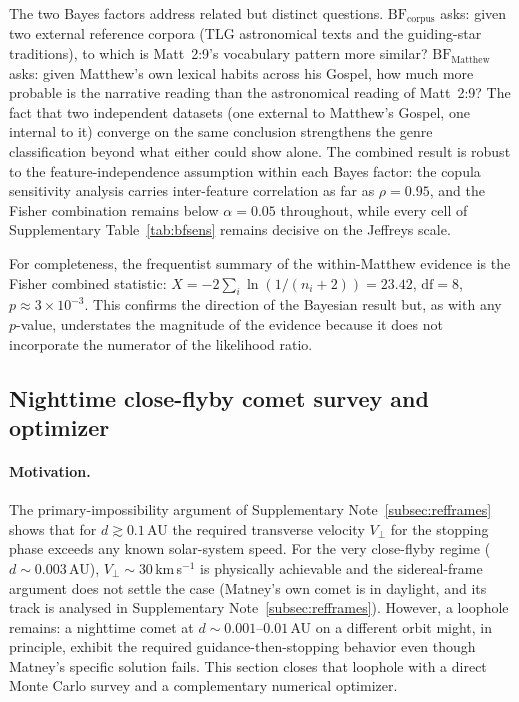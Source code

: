 \documentclass[11pt,a4paper]{article}
\begin{document}
The two Bayes factors address related but distinct questions.
$\mathrm{BF}_\text{corpus}$ asks: given two external reference corpora (TLG
astronomical texts and the guiding-star traditions), to which is Matt~2:9's
vocabulary pattern more similar? $\mathrm{BF}_\text{Matthew}$ asks: given
Matthew's own lexical habits across his Gospel, how much more probable is the
narrative reading than the astronomical reading of Matt~2:9? The fact that two
independent datasets (one external to Matthew's Gospel, one internal to
it) converge on the same conclusion strengthens the genre classification beyond
what either could show alone. The combined result is robust to the
feature-independence assumption within each Bayes factor: the copula
sensitivity analysis carries inter-feature correlation as far as
$\rho = 0.95$, and the Fisher combination remains below $\alpha = 0.05$
throughout, while every cell of Supplementary Table~\ref{tab:bfsens} remains decisive on the
Jeffreys scale.

For completeness, the frequentist summary of the within-Matthew evidence is the
Fisher combined statistic: $X = -2\sum_i \ln(1/(n_i+2)) = 23.42$,
$\mathrm{df} = 8$, $p \approx 3\times10^{-3}$. This confirms the direction of
the Bayesian result but, as with any $p$-value, understates the magnitude of the
evidence because it does not incorporate the numerator of the likelihood ratio.

\subsection{Nighttime close-flyby comet survey and optimizer}
\label{subsec:closeflyby}

\paragraph{Motivation.}
The primary-impossibility argument of Supplementary Note~\ref{subsec:refframes} shows that for $d \gtrsim 0.1$\,AU
the required transverse velocity $V_\perp$ for the stopping phase exceeds any
known solar-system speed. For the very close-flyby regime ($d \sim 0.003$\,AU),
$V_\perp \sim 30$\,km\,s$^{-1}$ is physically achievable and the sidereal-frame
argument does not settle the case (Matney's own comet is in daylight, and its
track is analysed in Supplementary Note~\ref{subsec:refframes}). However, a loophole
remains: a nighttime comet at $d \sim 0.001$--$0.01$\,AU on a different orbit
might, in principle, exhibit the required guidance-then-stopping behavior even
though Matney's specific solution fails. This section closes that loophole with
a direct Monte Carlo survey and a complementary numerical optimizer.
\end{document}
